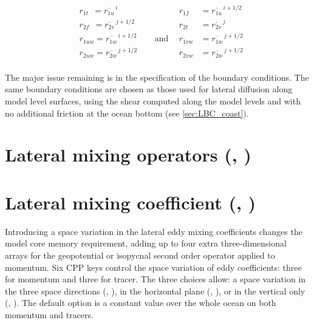 \documentclass[../main/NEMO_manual]{subfiles}
\begin{document}
\[
  \begin{aligned}
    &r_{1t}\ \ = \overline{r_{1u}}^{\,i}       &&&    r_{1f}\ \ &= \overline{r_{1u}}^{\,i+1/2} \\
    &r_{2f} \ \ = \overline{r_{2v}}^{\,j+1/2} &&& 	r_{2t}\ &= \overline{r_{2v}}^{\,j} \\
    &r_{1uw}  = \overline{r_{1w}}^{\,i+1/2} &&\ \ \text{and} \ \ &   r_{1vw}&= \overline{r_{1w}}^{\,j+1/2} \\
    &r_{2uw}= \overline{r_{2w}}^{\,j+1/2} &&&         r_{2vw}&= \overline{r_{2w}}^{\,j+1/2}\\
  \end{aligned}
\]

The major issue remaining is in the specification of the boundary conditions.
The same boundary conditions are chosen as those used for lateral diffusion along model level surfaces,
\ie using the shear computed along the model levels and with no additional friction at the ocean bottom
(see \autoref{sec:LBC_coast}).


\section{Lateral mixing operators (\protect{}, \protect{}) }
\label{sec:LDF_op}


   
\section{Lateral mixing coefficient (\protect{}, \protect{}) }
\label{sec:LDF_coef}

Introducing a space variation in the lateral eddy mixing coefficients changes the model core memory requirement,
adding up to four extra three-dimensional arrays for the geopotential or isopycnal second order operator applied to 
momentum.
Six CPP keys control the space variation of eddy coefficients: three for momentum and three for tracer.
The three choices allow:
a space variation in the three space directions (,  ),
in the horizontal plane (,  ),
or in the vertical only (,  ).
The default option is a constant value over the whole ocean on both momentum and tracers. 
   
\end{document}
